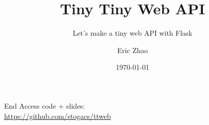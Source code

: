 \documentclass[xcolor={dvipsnames},xtable]{beamer}
\title{Tiny Tiny Web API}
\subtitle{Let's make a tiny web API with Flask}
\date{\today}
\author{Eric Zhao}
\begin{document}
\newcommand{\subdir}{sections}
\newcommand{\codedir}{ttweb}
\newcommand{\codefile}{\codedir/__init__.py}


\maketitle

\newcommand{\sectiontitle}{}
\newcommand{\currenttitle}{}



\renewcommand{\currenttitle}{End}
\begin{frame}{\currenttitle}
  Access code + slides: \\
  \url{https://github.com/stogacs/ttweb}
\end{frame}
\end{document}
